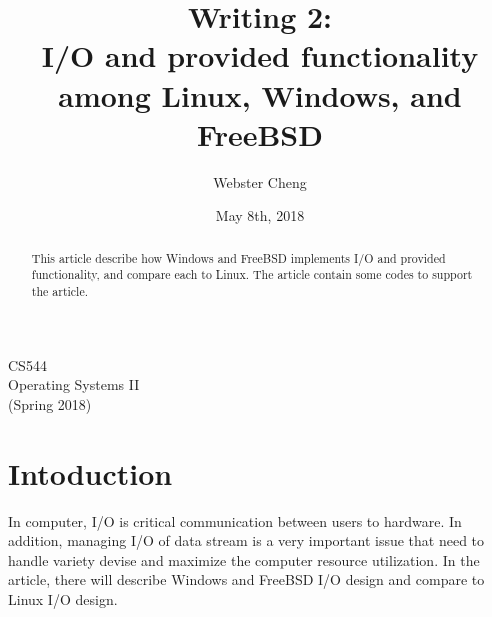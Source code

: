 \documentclass[letterpaper,draftclsnofoot,journal,compsoc,10pt,onecolumn]{IEEEtran}
\title{Writing 2: \\
 I/O and provided functionality among Linux, Windows, and FreeBSD}
\author{
  Webster Cheng
}
\date{May 8th, 2018}
\begin{document}
\begin{titlepage} 
\maketitle
\begin{center}
CS544\\
Operating Systems II\\
(Spring 2018)
\vspace{50 mm}
\end{center}

\begin{abstract}
This article describe how Windows and FreeBSD implements I/O and provided functionality, and compare each to Linux. The article contain some codes to support the article.
\end{abstract}
\end{titlepage}

\section{Intoduction}
\indent In computer, I/O is critical communication between users to hardware. In addition, managing I/O of data stream is a very important issue that need to handle variety devise and maximize the computer resource utilization. In the article, there will describe Windows and FreeBSD I/O design and compare to Linux I/O design.

\end{document}
